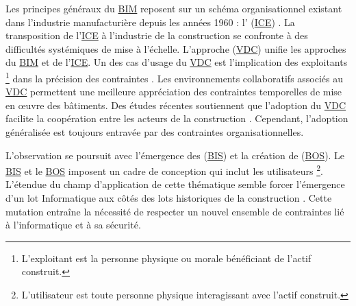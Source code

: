 \documentclass[a4paper,12pt]{article}
\begin{document}
Les principes généraux du \protect\hyperlink{gls-1}{\label{gls-1-use-7}BIM} reposent sur un schéma organisationnel existant dans l’industrie manufacturière depuis les années 1960 \autocite{caelenConsommateurAuCoeur2004a} : l'  (\protect\hyperlink{gls-2}{\label{gls-2-use-1}ICE}) \autocite{delsavioVirtualDesignConstruction2022}. La transposition de l’\protect\hyperlink{gls-2}{\label{gls-2-use-2}ICE} à l’industrie de la construction se confronte à des difficultés systémiques de mise à l’échelle. L’approche  (\protect\hyperlink{gls-3}{\label{gls-3-use-1}VDC}) unifie les approches du \protect\hyperlink{gls-1}{\label{gls-1-use-8}BIM} et de l’\protect\hyperlink{gls-2}{\label{gls-2-use-3}ICE}. Un des cas d’usage du \protect\hyperlink{gls-3}{\label{gls-3-use-2}VDC} est  l’implication des exploitants \footnote{L’exploitant est la personne physique ou morale bénéficiant de l’actif construit.} dans la précision des contraintes \autocite{delsavioVirtualDesignConstruction2022,mathiaspettergustafssonRoleVDCProfessionals2015a}. Les environnements collaboratifs associés au \protect\hyperlink{gls-3}{\label{gls-3-use-3}VDC} permettent une meilleure appréciation des contraintes temporelles de mise en œuvre des bâtiments. Des études récentes soutiennent que l'adoption du \protect\hyperlink{gls-3}{\label{gls-3-use-4}VDC} facilite la coopération entre les acteurs de la construction \autocite{delsavioVirtualDesignConstruction2022,mugheesaslamIntegratedImplementationVirtual2021}. Cependant, l'adoption généralisée est toujours entravée par des contraintes organisationnelles.

L’observation se poursuit avec l’émergence des  (\protect\hyperlink{gls-4}{\label{gls-4-use-1}BIS}) et la création de  (\protect\hyperlink{gls-5}{\label{gls-5-use-1}BOS}). Le \protect\hyperlink{gls-4}{\label{gls-4-use-2}BIS} et le \protect\hyperlink{gls-5}{\label{gls-5-use-2}BOS} imposent un cadre de conception qui inclut les utilisateurs \footnote{L’utilisateur est toute personne physique interagissant avec l’actif construit.}. L’étendue du champ d’application de cette thématique semble forcer l’émergence d’un lot Informatique aux côtés des lots historiques de la construction \autocites{mohamedyassinebenjemaaImplementationSolutionsIntegrees2017a}[][]{cottetSystemesTempsReel2005}{smartbuildingallianceBISBOSOutils2022}. Cette mutation entraîne la nécessité de respecter un nouvel ensemble de contraintes lié à l’informatique et à sa sécurité.
\end{document}
